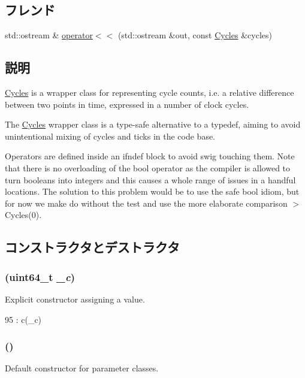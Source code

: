 \subsection*{フレンド}
\begin{DoxyCompactItemize}
\item 
std::ostream \& \hyperlink{classCycles_a1afa18482d21eabd38b7a50c54e10200}{operator$<$$<$} (std::ostream \&out, const \hyperlink{classCycles}{Cycles} \&cycles)
\end{DoxyCompactItemize}


\subsection{説明}
\hyperlink{classCycles}{Cycles} is a wrapper class for representing cycle counts, i.e. a relative difference between two points in time, expressed in a number of clock cycles.

The \hyperlink{classCycles}{Cycles} wrapper class is a type-\/safe alternative to a typedef, aiming to avoid unintentional mixing of cycles and ticks in the code base.

Operators are defined inside an ifndef block to avoid swig touching them. Note that there is no overloading of the bool operator as the compiler is allowed to turn booleans into integers and this causes a whole range of issues in a handful locations. The solution to this problem would be to use the safe bool idiom, but for now we make do without the test and use the more elaborate comparison $>$ Cycles(0). 

\subsection{コンストラクタとデストラクタ}
\hypertarget{classCycles_a9ce5a70bae621848f60ec089ea37d9ab}{
\subsubsection[{Cycles}]{ (uint64\_\-t {\em \_\-c})}}
\label{classCycles_a9ce5a70bae621848f60ec089ea37d9ab}
Explicit constructor assigning a value. 


\begin{DoxyCode}
95 : c(_c) { }
\end{DoxyCode}
\hypertarget{classCycles_a61a19851e99ce348eb6548355467ca64}{
\subsubsection[{Cycles}]{ ()}}
\label{classCycles_a61a19851e99ce348eb6548355467ca64}
Default constructor for parameter classes. 


